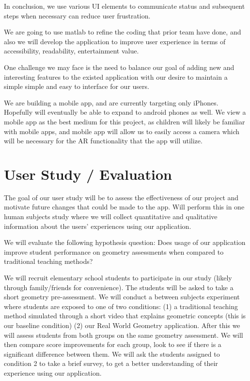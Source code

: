 \documentclass[manuscript, nonacm]{acmart}
\begin{document}
In conclusion, we use various UI elements to communicate status and subsequent
steps when necessary can reduce user frustration.

We are going to use matlab to refine the coding that prior team have done, and
also we will develop the application to improve user experience in terms of
accessibility, readability, entertainment value.

One challenge we may face is the need to balance our goal of adding new and
interesting features to the existed application with our desire to maintain a
simple simple and easy to interface for our users.

We are building a mobile app, and are currently targeting only
iPhones. Hopefully will eventually be able to expand to android phones as
well. We view a mobile app as the best medium for this project, as children will
likely be familiar with mobile apps, and mobile app will allow us to easily
access a camera which will be necessary for the AR functionality that the app
will utilize.

\section{User Study / Evaluation}

The goal of our user study will be to assess the effectiveness of our project
and motivate future changes that could be made to the app. Will perform this in
one human subjects study where we will collect quantitative and qualitative
information about the users' experiences using our application.

We will evaluate the following hypothesis question: Does usage of our
application improve student performance on geometry assessments when compared to
traditional teaching methods?

We will recruit elementary school students to participate in our study (likely
through family/friends for convenience). The students will be asked to take a
short geometry pre-assessment. We will conduct a between subjects experiment
where students are exposed to one of two conditions: (1) a traditional teaching
method simulated through a short video that explains geometric concepts (this is
our baseline condition) (2) our Real World Geometry application. After this we
will assess students from both groups on the same geometry assessment. We will
then compare score improvements for each group, look to see if there is a
significant difference between them. We will ask the students assigned to
condition 2 to take a brief survey, to get a better understanding of their
experience using our application.
\end{document}
